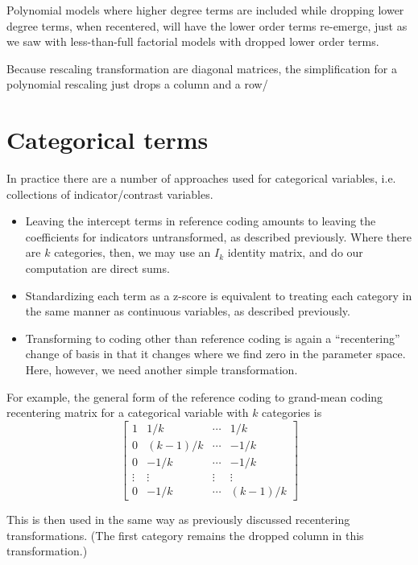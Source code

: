 \documentclass[]{article}
\providecommand{\tightlist}{%
  \setlength{\itemsep}{0pt}\setlength{\parskip}{0pt}}
\begin{document}
Polynomial models where higher degree terms are included while dropping
lower degree terms, when recentered, will have the lower order terms
re-emerge, just as we saw with less-than-full factorial models with
dropped lower order terms.

Because rescaling transformation are diagonal matrices, the
simplification for a polynomial rescaling just drops a column and a row/

\hypertarget{categorical-terms}{%
\section{Categorical terms}\label{categorical-terms}}

In practice there are a number of approaches used for categorical
variables, i.e. collections of indicator/contrast variables.

\begin{itemize}
\tightlist
\item
  Leaving the intercept terms in reference coding amounts to leaving the
  coefficients for indicators untransformed, as described previously.
  Where there are \(k\) categories, then, we may use an \(I_k\) identity
  matrix, and do our computation are direct sums.
\item
  Standardizing each term as a z-score is equivalent to treating each
  category in the same manner as continuous variables, as described
  previously.
\item
  Transforming to coding other than reference coding is again a
  ``recentering'' change of basis in that it changes where we find zero
  in the parameter space. Here, however, we need another simple
  transformation.
\end{itemize}

For example, the general form of the reference coding to grand-mean
coding recentering matrix for a categorical variable with \(k\)
categories is \[
\begin{bmatrix}
1 &1/k     &\cdots &1/k \\
0 &(k-1)/k &\cdots &-1/k \\
0 &-1/k    &\cdots &-1/k \\
\vdots &\vdots &\vdots &\vdots \\
0 &-1/k    &\cdots &(k-1)/k
\end{bmatrix}
\]

This is then used in the same way as previously discussed recentering
transformations. (The first category remains the dropped column in this
transformation.)
\end{document}
